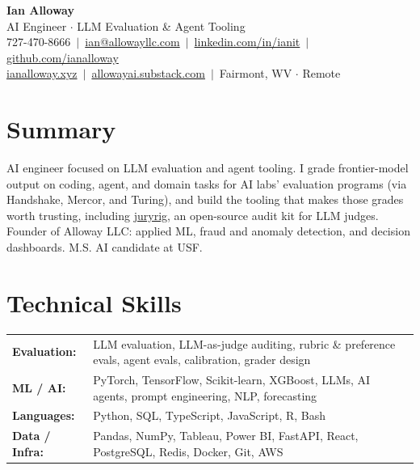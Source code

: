 \documentclass[10pt,letterpaper]{article}
\begin{document}
\begin{center}
    {\LARGE\bfseries Ian Alloway} \\[3pt]
    AI Engineer $\cdot$ LLM Evaluation \& Agent Tooling \\[3pt]
    727-470-8666 \,$\vert$\,
    \href{mailto:ian@allowayllc.com}{ian@allowayllc.com} \,$\vert$\,
    \href{https://linkedin.com/in/ianit}{linkedin.com/in/ianit} \,$\vert$\,
    \href{https://github.com/ianalloway}{github.com/ianalloway} \\[2pt]
    \href{https://ianalloway.xyz}{ianalloway.xyz} \,$\vert$\,
    \href{https://allowayai.substack.com}{allowayai.substack.com} \,$\vert$\,
    Fairmont, WV $\cdot$ Remote
\end{center}

\vspace{-2pt}

\section{Summary}
AI engineer focused on LLM evaluation and agent tooling. I grade frontier-model output on coding, agent, and domain tasks for AI labs' evaluation programs (via Handshake, Mercor, and Turing), and build the tooling that makes those grades worth trusting, including \href{https://github.com/ianalloway/juryrig}{juryrig}, an open-source audit kit for LLM judges. Founder of Alloway LLC: applied ML, fraud and anomaly detection, and decision dashboards. M.S. AI candidate at USF.

\section{Technical Skills}
\begin{tabularx}{\textwidth}{@{}l X@{}}
\textbf{Evaluation:} & LLM evaluation, LLM-as-judge auditing, rubric \& preference evals, agent evals, calibration, grader design \\
\textbf{ML / AI:} & PyTorch, TensorFlow, Scikit-learn, XGBoost, LLMs, AI agents, prompt engineering, NLP, forecasting \\
\textbf{Languages:} & Python, SQL, TypeScript, JavaScript, R, Bash \\[-1pt]
\textbf{Data / Infra:} & Pandas, NumPy, Tableau, Power BI, FastAPI, React, PostgreSQL, Redis, Docker, Git, AWS \\
\end{tabularx}
\end{document}
